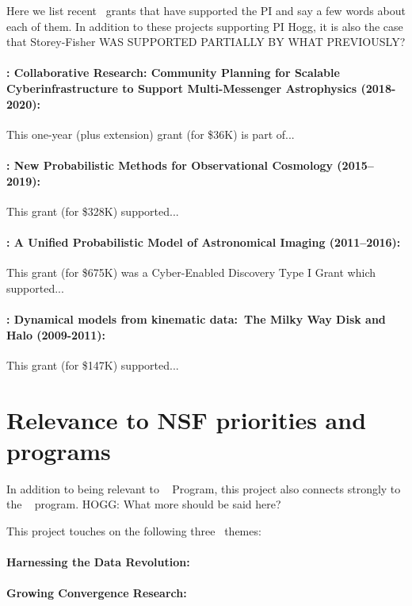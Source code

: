 \documentclass[12pt, fullpage, letterpaper]{article}
\begin{document}
Here we list recent \NSF\ grants that have supported the PI and say a
few words about each of them.
In addition to these projects supporting PI Hogg, it is also the case
that Storey-Fisher WAS SUPPORTED PARTIALLY BY WHAT PREVIOUSLY?

\paragraph{: Collaborative Research: Community Planning for Scalable Cyberinfrastructure to Support Multi-Messenger Astrophysics (2018-2020):}
This one-year (plus extension) grant (for \$36K) is part of...

\paragraph{: New Probabilistic Methods for Observational Cosmology (2015--2019):}
This grant (for \$328K) supported...

\paragraph{: A Unified Probabilistic Model of Astronomical Imaging (2011--2016):}
This grant (for \$675K) was a Cyber-Enabled Discovery Type I Grant which supported...

\paragraph{: Dynamical models from kinematic data:\ The Milky Way Disk and Halo (2009-2011):}
This grant (for \$147K) supported...

\section{Relevance to NSF priorities and programs}

In addition to being relevant to \NSF\  Program, this project also
connects strongly to the \NSF\  program.
HOGG: What more should be said here?

This project touches on the following three \NSF\ themes:

\paragraph{Harnessing the Data Revolution:}

\paragraph{Growing Convergence Research:}
\end{document}
